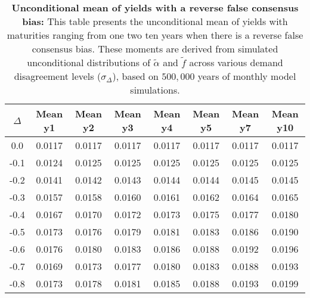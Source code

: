 \begin{table}[h!]
\centering
\caption{\textbf{Unconditional mean of yields with a reverse false consensus bias:} This table presents the unconditional mean of yields with maturities ranging from one two ten years when there is a reverse false consensus bias. These moments are derived from simulated unconditional distributions of $\tilde{\alpha}$ and $\tilde{f}$ across various demand disagreement levels ($\sigma_{\Delta}$), based on $500,000$ years of monthly model simulations.}
\begin{tabular}{c|ccccccc}
\hline
$\Delta$ & Mean y1 & Mean y2 & Mean y3 & Mean y4 & Mean y5 & Mean y7 & Mean y10 \\
\hline
0.0  & 0.0117 & 0.0117 & 0.0117 & 0.0117 & 0.0117 & 0.0117 & 0.0117 \\
-0.1 & 0.0124 & 0.0125 & 0.0125 & 0.0125 & 0.0125 & 0.0125 & 0.0125 \\
-0.2 & 0.0141 & 0.0142 & 0.0143 & 0.0144 & 0.0144 & 0.0145 & 0.0145 \\
-0.3 & 0.0157 & 0.0158 & 0.0160 & 0.0161 & 0.0162 & 0.0164 & 0.0165 \\
-0.4 & 0.0167 & 0.0170 & 0.0172 & 0.0173 & 0.0175 & 0.0177 & 0.0180 \\
-0.5 & 0.0173 & 0.0176 & 0.0179 & 0.0181 & 0.0183 & 0.0186 & 0.0190 \\
-0.6 & 0.0176 & 0.0180 & 0.0183 & 0.0186 & 0.0188 & 0.0192 & 0.0196 \\
-0.7 & 0.0169 & 0.0173 & 0.0177 & 0.0180 & 0.0183 & 0.0188 & 0.0193 \\
-0.8 & 0.0173 & 0.0178 & 0.0181 & 0.0185 & 0.0188 & 0.0193 & 0.0199 \\
\hline
\end{tabular}
\end{table}

